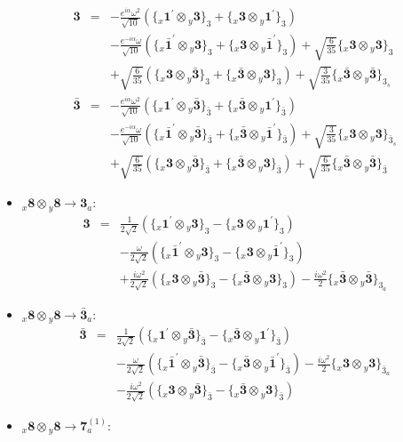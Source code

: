 \documentclass[english]{article}
\newcommand{\rep}[1]{\mathbf{#1}}
\newcommand{\repx}[2]{{}_{#2}\mathbf{#1}}
\newcommand{\subcg}[3]{\big\{ \repx{#1}{x}\otimes\repx{#2}{y}\big\}^{}_{#3}}
\begin{document}
\begin{itemize}
\begin{eqnarray*}
\\
\rep{3} &=& -\frac{e^{i \alpha } \omega ^2}{\sqrt{10}}\left(\subcg{1^{\prime}}{3}{3}+\subcg{3}{1^{\prime}}{3}\right) \\ 
 & & -\frac{e^{-i \alpha } \omega }{\sqrt{10}}\left(\subcg{\bar{1}^{\prime}}{3}{3}+\subcg{3}{\bar{1}^{\prime}}{3}\right)+\sqrt{\frac{6}{35}}\subcg{3}{3}{3} \\ 
 & & +\sqrt{\frac{6}{35}}\left(\subcg{3}{\bar{3}}{3}+\subcg{\bar{3}}{3}{3}\right)+\sqrt{\frac{3}{35}}\subcg{\bar{3}}{\bar{3}}{3_{s}}
\\
\rep{\bar{3}} &=& -\frac{e^{i \alpha } \omega ^2}{\sqrt{10}}\left(\subcg{1^{\prime}}{\bar{3}}{\bar{3}}+\subcg{\bar{3}}{1^{\prime}}{\bar{3}}\right) \\ 
 & & -\frac{e^{-i \alpha } \omega }{\sqrt{10}}\left(\subcg{\bar{1}^{\prime}}{\bar{3}}{\bar{3}}+\subcg{\bar{3}}{\bar{1}^{\prime}}{\bar{3}}\right)+\sqrt{\frac{3}{35}}\subcg{3}{3}{\bar{3}_{s}} \\ 
 & & +\sqrt{\frac{6}{35}}\left(\subcg{3}{\bar{3}}{\bar{3}}+\subcg{\bar{3}}{3}{\bar{3}}\right)+\sqrt{\frac{6}{35}}\subcg{\bar{3}}{\bar{3}}{\bar{3}}
\end{eqnarray*}
\item $\repx{8}{x}\otimes\repx{8}{y}\to\rep{3}_{a}$:
\begin{eqnarray*}
\rep{3} &=& \frac{1}{2 \sqrt{2}}\left(\subcg{1^{\prime}}{3}{3}-\subcg{3}{1^{\prime}}{3}\right) \\ 
 & & -\frac{\omega }{2 \sqrt{2}}\left(\subcg{\bar{1}^{\prime}}{3}{3}-\subcg{3}{\bar{1}^{\prime}}{3}\right) \\ 
 & & +\frac{i \omega ^2}{2 \sqrt{2}}\left(\subcg{3}{\bar{3}}{3}-\subcg{\bar{3}}{3}{3}\right)-\frac{i \omega ^2}{2}\subcg{\bar{3}}{\bar{3}}{3_{a}}
\end{eqnarray*}
\item $\repx{8}{x}\otimes\repx{8}{y}\to\rep{\bar{3}}_{a}$:
\begin{eqnarray*}
\rep{\bar{3}} &=& \frac{1}{2 \sqrt{2}}\left(\subcg{1^{\prime}}{\bar{3}}{\bar{3}}-\subcg{\bar{3}}{1^{\prime}}{\bar{3}}\right) \\ 
 & & -\frac{\omega }{2 \sqrt{2}}\left(\subcg{\bar{1}^{\prime}}{\bar{3}}{\bar{3}}-\subcg{\bar{3}}{\bar{1}^{\prime}}{\bar{3}}\right)-\frac{i \omega ^2}{2}\subcg{3}{3}{\bar{3}_{a}} \\ 
 & & -\frac{i \omega ^2}{2 \sqrt{2}}\left(\subcg{3}{\bar{3}}{\bar{3}}-\subcg{\bar{3}}{3}{\bar{3}}\right)
\end{eqnarray*}
\item $\repx{8}{x}\otimes\repx{8}{y}\to\rep{7}_{a}^{(1)}$:

\end{itemize}
\end{document}
